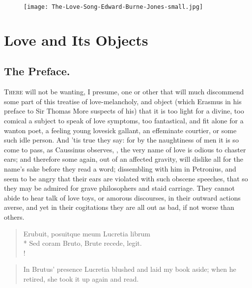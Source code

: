 \cleartoleftpage{}
\begin{figure}[p!]
  \begingroup
  \centering
  \texttt{[image: The-Love-Song-Edward-Burne-Jones-small.jpg]}
  \label{fig:thelovesong}
\end{figure}

\clearpage{}
\thispagestyle{titleontop}
\chapter{Love and Its Objects}
{
\section{The Preface.}

\lettrine{T}{here} will not be wanting, I presume, one or other that will much
discommend some part of this treatise of love-melancholy, and object
(which Erasmus in his preface to Sir Thomas More suspects of his)
that it is too light for a divine, too comical a subject to speak of
love symptoms, too fantastical, and fit alone for a wanton poet, a
feeling young lovesick gallant, an effeminate courtier, or some such
idle person. And 'tis true they say: for by the naughtiness of men it
is so come to pass, as  Caussinus observes, , the very name of love is odious to
chaster ears; and therefore some again, out of an affected gravity,
will dislike all for the name's sake before they read a word;
dissembling with him in Petronius, and seem to be angry that
their ears are violated with such obscene speeches, that so they may be
admired for grave philosophers and staid carriage. They cannot abide to
hear talk of love toys, or amorous discourses,  in
their outward actions averse, and yet in their cogitations they are all
out as bad, if not worse than others.

\begin{latin}
\begin{verse}%
Erubuit, posuitque meum Lucretia librum\\*
Sed coram Bruto, Brute recede, legit.\\!
\end{verse}%
\end{latin}
\translationrule%
\begin{verse}%
In Brutus' presence Lucretia blushed and laid my book aside;
when he retired, she took it up again and read.
\end{verse}%

}
